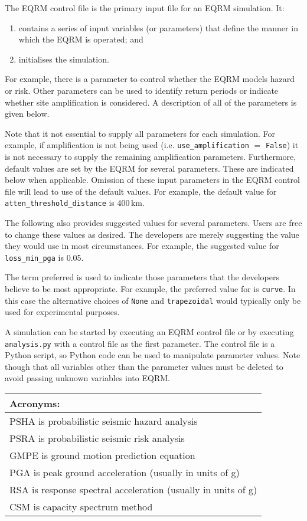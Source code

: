 
The EQRM control file is the primary input file for an EQRM
simulation. It:
\begin{enumerate}
\item contains a series of input variables (or parameters) that define
the manner in which the EQRM is operated; and
\item initialises the simulation.
\end{enumerate}
For example, there is a parameter to control whether the EQRM models
hazard or risk. Other parameters can be used to identify return 
periods or indicate whether site amplification is considered. A
description of all of the parameters is given below.

Note that it not essential to supply all parameters for each
simulation. For example, if amplification is not being used (i.e.
\texttt{use\_amplification} $=$ \texttt{False}) it is not necessary
to supply the remaining amplification parameters. Furthermore,
default values are set by the EQRM for several parameters. These are
indicated below when applicable. Omission of these input
parameters in the EQRM control file will lead to use of the
default values. For example, the default value for
\texttt{atten\_threshold\_distance} is 400\,km.

The following also provides suggested values for several parameters.
Users are free to change these values as desired. The developers are
merely suggesting the value they would use in most circumstances.
For example, the suggested value for \texttt{loss\_min\_pga} is
0.05.

The term preferred is used to indicate those parameters
that the developers believe to be most appropriate. For example,
the preferred value for  is
\texttt{curve}. In this case the alternative choices of
\texttt{None} and \texttt{trapezoidal} would typically only be used for
experimental purposes.

A simulation can be started by executing an EQRM control file or by
executing \texttt{analysis.py} with a control file as the first
parameter.  The control file is a Python script, so Python code can be
used to manipulate parameter values.  Note though that all variables
other than the parameter values must be deleted to avoid passing
unknown variables into EQRM.

\vspace{2em}

\begin{tabular}{l}
\hline
\textbf{Acronyms}: \\
\hline
PSHA is probabilistic seismic hazard analysis \\
PSRA is probabilistic seismic risk analysis  \\
GMPE is ground motion prediction equation \\
PGA is peak ground acceleration (usually in units of g) \\
RSA is response spectral acceleration (usually in units of g) \\
CSM is capacity spectrum method \\
\hline
\end{tabular}

